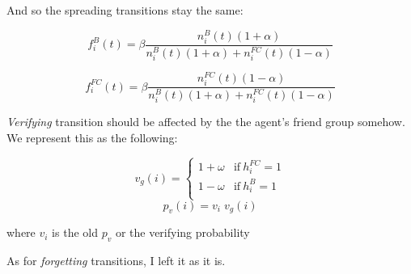 \documentclass{article}
\begin{document}
And so the spreading transitions stay the same:

\[f_i^B(t)=\beta\frac{n_i^B(t)(1+\alpha)}{n_i^B(t)(1+\alpha)+n_i^{FC}(t)(1-\alpha)}\]

\[f_i^{FC}(t)=\beta\frac{n_i^{FC}(t)(1-\alpha)}{n_i^B(t)(1+\alpha)+n_i^{FC}(t)(1-\alpha)}\]

\textit{Verifying} transition should be affected by the
the agent's friend group somehow. We represent this as
the following:

\[ 
  v_g(i) = 
  \begin{cases} 
      1+\omega & \text{if}\ h_i^{FC} = 1 \\
      1-\omega & \text{if}\ h_i^B = 1 \\
  \end{cases}
\]
\[ p_v(i) = v_i\;v_g(i) \]

where $v_i$ is the old $p_v$ or the verifying probability

As for \textit{forgetting} transitions, I left it as it is.
%
%
%
%
%
\end{document}

